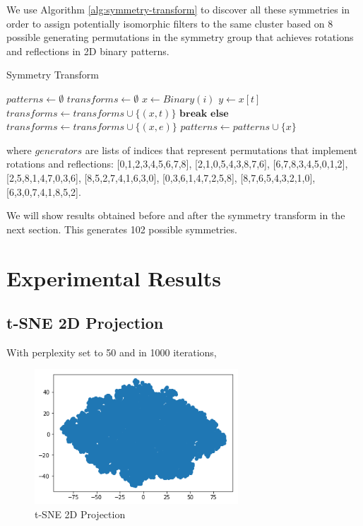 \documentclass{article} %
\begin{document}
We use Algorithm \ref{alg:symmetry-transform} to discover all these symmetries in order to assign potentially isomorphic filters to the same cluster based on 8 possible generating permutations in the symmetry group that achieves rotations and reflections in 2D binary patterns.

\begin{algorithm}[ht]
\caption{Symmetry Transform}
\label{alg:symmetry-transform}
\begin{algorithmic}
		\State $patterns \gets \emptyset$
		\State $transforms \gets \emptyset$
			\State $x \gets Binary(i)$ 
				\State $y \gets x[t]$
					\State $transforms \gets transforms \cup \{ (x,t) \}$
					\State $\textbf{break}$
				\EndIf
			\EndFor
			\State $\textbf{else}$
			\Indent
				\State $transforms \gets transforms \cup \{ (x,e) \}$ 
				\State $patterns \gets patterns \cup \{ x \}$ 
			\EndIndent
		\EndFor
\EndProcedure
\end{algorithmic}
\end{algorithm}

where $generators$ are lists of indices that represent permutations that implement rotations and reflections: [0,1,2,3,4,5,6,7,8],
    [2,1,0,5,4,3,8,7,6],
    [6,7,8,3,4,5,0,1,2],
    [2,5,8,1,4,7,0,3,6],
    [8,5,2,7,4,1,6,3,0],
    [0,3,6,1,4,7,2,5,8],
    [8,7,6,5,4,3,2,1,0],
    [6,3,0,7,4,1,8,5,2].

We will show results obtained before and after the symmetry transform in the next section.
This generates 102 possible symmetries.

\section{Experimental Results}

\subsection{t-SNE 2D Projection}

With perplexity set to 50 and in 1000 iterations,

\begin{figure}[H]
	\centering
	\includegraphics[width=3in]{Figures/ul0.png}
	\caption{t-SNE 2D Projection}
	\label{fig:tsne}
\end{figure}
\end{document}
